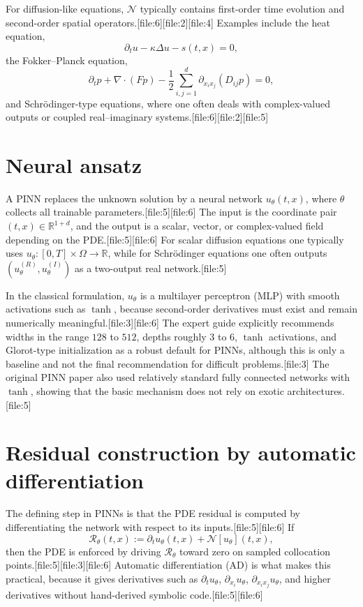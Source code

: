 \documentclass[11pt]{report}
\begin{document}
For diffusion-like equations, \(\mathcal{N}\) typically contains first-order time evolution and second-order spatial operators.[file:6][file:2][file:4]  
Examples include the heat equation,
\[
\partial_t u - \kappa \Delta u - s(t,x)=0,
\]
the Fokker--Planck equation,
\[
\partial_t p + \nabla\cdot(Fp) - \frac12 \sum_{i,j=1}^d \partial_{x_i x_j}\!\left(D_{ij} p\right)=0,
\]
and Schr\"odinger-type equations, where one often deals with complex-valued outputs or coupled real--imaginary systems.[file:6][file:2][file:5]

\section{Neural ansatz}

A PINN replaces the unknown solution by a neural network \(u_\theta(t,x)\), where \(\theta\) collects all trainable parameters.[file:5][file:6]  
The input is the coordinate pair \((t,x)\in \mathbb{R}^{1+d}\), and the output is a scalar, vector, or complex-valued field depending on the PDE.[file:5][file:6]  
For scalar diffusion equations one typically uses \(u_\theta:[0,T]\times \Omega \to \mathbb{R}\), while for Schr\"odinger equations one often outputs \((u_\theta^{(R)},u_\theta^{(I)})\) as a two-output real network.[file:5]

In the classical formulation, \(u_\theta\) is a multilayer perceptron (MLP) with smooth activations such as \(\tanh\), because second-order derivatives must exist and remain numerically meaningful.[file:3][file:6]  
The expert guide explicitly recommends widths in the range \(128\) to \(512\), depths roughly \(3\) to \(6\), \(\tanh\) activations, and Glorot-type initialization as a robust default for PINNs, although this is only a baseline and not the final recommendation for difficult problems.[file:3]  
The original PINN paper also used relatively standard fully connected networks with \(\tanh\), showing that the basic mechanism does not rely on exotic architectures.[file:5]

\section{Residual construction by automatic differentiation}

The defining step in PINNs is that the PDE residual is computed by differentiating the network with respect to its inputs.[file:5][file:6]  
If
\[
\mathcal{R}_\theta(t,x)
:= \partial_t u_\theta(t,x) + \mathcal{N}[u_\theta](t,x),
\]
then the PDE is enforced by driving \(\mathcal{R}_\theta\) toward zero on sampled collocation points.[file:5][file:3][file:6]  
Automatic differentiation (AD) is what makes this practical, because it gives derivatives such as \(\partial_t u_\theta\), \(\partial_{x_i}u_\theta\), \(\partial_{x_i x_j}u_\theta\), and higher derivatives without hand-derived symbolic code.[file:5][file:6]
\end{document}
